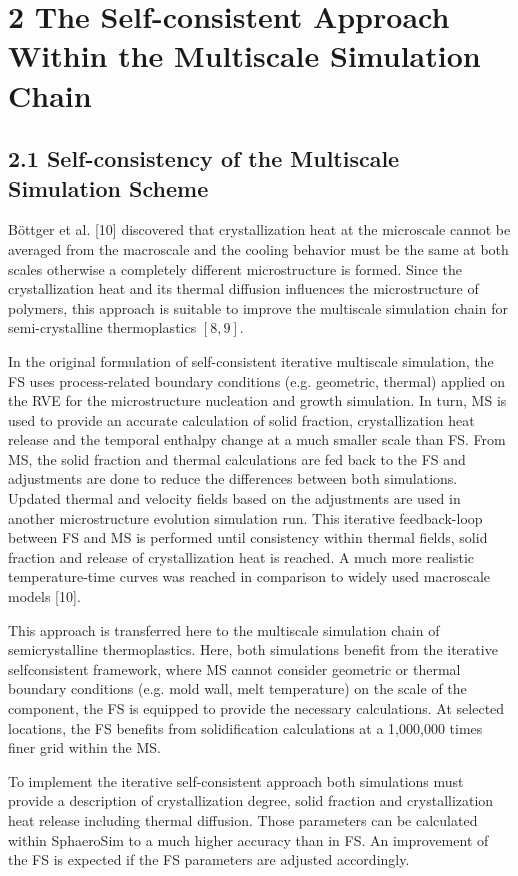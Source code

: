 \documentclass[10pt]{article}
\begin{document}
\section*{2 The Self-consistent Approach Within the Multiscale Simulation Chain}
\subsection*{2.1 Self-consistency of the Multiscale Simulation Scheme}
Böttger et al. [10] discovered that crystallization heat at the microscale cannot be averaged from the macroscale and the cooling behavior must be the same at both scales otherwise a completely different microstructure is formed. Since the crystallization heat and its thermal diffusion influences the microstructure of polymers, this approach is suitable to improve the multiscale simulation chain for semi-crystalline thermoplastics $[8,9]$.

In the original formulation of self-consistent iterative multiscale simulation, the FS uses process-related boundary conditions (e.g. geometric, thermal) applied on the RVE for the microstructure nucleation and growth simulation. In turn, MS is used to provide an accurate calculation of solid fraction, crystallization heat release and the temporal enthalpy change at a much smaller scale than FS. From MS, the solid fraction and thermal calculations are fed back to the FS and adjustments are done to reduce the differences between both simulations. Updated thermal and velocity fields based on the adjustments are used in another microstructure evolution simulation run. This iterative feedback-loop between FS and MS is performed until consistency within thermal fields, solid fraction and release of crystallization heat is reached. A much more realistic temperature-time curves was reached in comparison to widely used macroscale models [10].

This approach is transferred here to the multiscale simulation chain of semicrystalline thermoplastics. Here, both simulations benefit from the iterative selfconsistent framework, where MS cannot consider geometric or thermal boundary conditions (e.g. mold wall, melt temperature) on the scale of the component, the FS is equipped to provide the necessary calculations. At selected locations, the FS benefits from solidification calculations at a 1,000,000 times finer grid within the MS.

To implement the iterative self-consistent approach both simulations must provide a description of crystallization degree, solid fraction and crystallization heat release including thermal diffusion. Those parameters can be calculated within SphaeroSim to a much higher accuracy than in FS. An improvement of the FS is expected if the FS parameters are adjusted accordingly.
\end{document}

